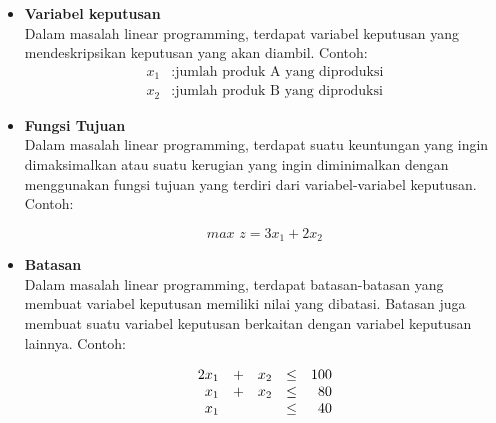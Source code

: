 \begin{itemize}
	\item \textbf{Variabel keputusan}\\
		Dalam masalah linear programming, terdapat variabel keputusan yang mendeskripsikan keputusan yang akan diambil. Contoh:
		\begin{equation*}
			\begin{split}
				x_1 &: \text{jumlah produk A yang diproduksi} \\
    			x_2 &: \text{jumlah produk B yang diproduksi}
			\end{split}
		\end{equation*}
		
	\item \textbf{Fungsi Tujuan}\\
		Dalam masalah linear programming, terdapat suatu keuntungan yang ingin dimaksimalkan atau suatu kerugian yang ingin diminimalkan dengan menggunakan  fungsi tujuan yang terdiri dari variabel-variabel keputusan. Contoh:
		
		\begin{equation*}
			\textit{max } z = 3x_1 + 2x_2
		\end{equation*}

	\item \textbf{Batasan}\\
		Dalam masalah linear programming, terdapat batasan-batasan yang membuat variabel keputusan memiliki nilai yang dibatasi. Batasan juga membuat suatu variabel keputusan berkaitan dengan variabel keputusan lainnya. Contoh:

		\begin{equation*}
			\begin{array}{r c r c r}
				2x_1 & + & x_2 & \leq & 100 \\
    			x_1 & + & x_2 & \leq & 80 \\
    			x_1 & & & \leq & 40
			\end{array}
		\end{equation*}
		

\end{itemize}
